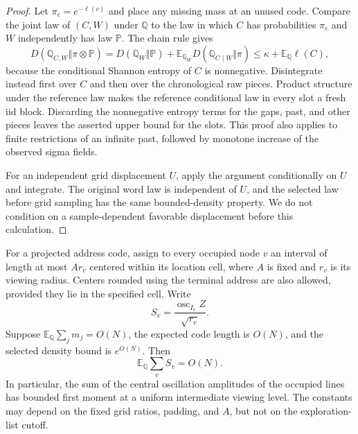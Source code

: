 \begin{proof}
Let $\pi_c=e^{-\ell(c)}$ and place any missing mass at an unused code.
Compare the joint law of $(C,W)$ under $\mathbb Q$ to the law in
which $C$ has probabilities $\pi_c$ and $W$ independently has law
$\mathbb P$.  The chain rule gives
\[
 D(\mathbb Q_{C,W}\Vert\pi\otimes\mathbb P)
 =D(\mathbb Q_W\Vert\mathbb P)
   +\mathbb E_{\mathbb Q_W}
        D(\mathbb Q_{C\mid W}\Vert\pi)
 \le\kappa+\mathbb E_{\mathbb Q}\ell(C),
\]
because the conditional Shannon entropy of $C$ is nonnegative.
Disintegrate instead first over $C$ and then over the chronological
raw pieces.  Product structure under the reference law makes the
reference conditional law in every slot a fresh iid block.  Discarding
the nonnegative entropy terms for the gaps, past, and other pieces
leaves the asserted upper bound for the slots.  This proof also
applies to finite restrictions of an infinite past, followed by
monotone increase of the observed sigma fields.

For an independent grid displacement $U$, apply the argument
conditionally on $U$ and integrate.  The original word law is
independent of $U$, and the selected law before grid sampling has
the same bounded-density property.  We do not condition on a
sample-dependent favorable displacement before this calculation.
\end{proof}

\begin{corollary}
\label{arm:central-oscillations}
For a projected address code, assign to every occupied node $v$ an
interval of length at most $A r_v$ centered within its location cell,
where $A$ is fixed and $r_v$ is its viewing radius.  Centers rounded
using the terminal address are also allowed, provided they lie in the
specified cell.  Write
\[
 S_v=\frac{\operatorname{osc}_{I_v}Z}{\sqrt{r_v}}.
\]
Suppose $\mathbb E_{\mathbb Q}\sum_jm_j=O(N)$, the expected code length
is $O(N)$, and the selected density bound is $e^{O(N)}$.  Then
\[
 \mathbb E_{\mathbb Q}\sum_v S_v=O(N).
\]
In particular, the sum of the central oscillation amplitudes of the
occupied lines has bounded first moment at a uniform intermediate
viewing level.  The constants may depend on the fixed grid ratios,
padding, and $A$, but not on the exploration-list cutoff.
\end{corollary}

